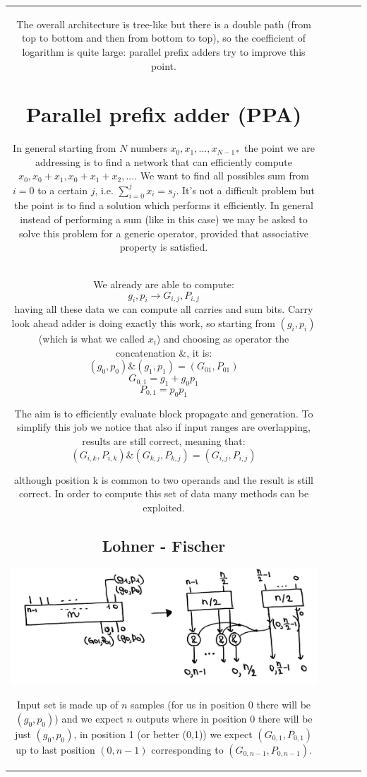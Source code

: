 \begin{center}
\begin{tabular}{|c|c|c|c|c|}
The overall architecture is tree-like but there is a double path (from top to bottom and then from bottom to top), so the coefficient of logarithm is quite large: parallel prefix adders try to improve this point.

\section{Parallel prefix adder (PPA)}

In general starting from $N$ numbers $x_0, x_1, ...,x_{N-1*}$ the point we are addressing is to find a network that can efficiently compute $x_0, x_0+x_1, x_0+x_1+x_2, ...$. We want to find all possibles sum from $i=0$ to a certain $j$, i.e. $\sum_{i=0}^{j} x_i=s_j$. It's not a difficult problem but the point is to find a solution which performs it efficiently. In general instead of performing a sum (like in this case) we may be asked to solve this problem for a generic operator, provided that associative property is satisfied.\\

We already are able to compute:
$$g_i, p_i \longrightarrow G_{i, j}, P_{i, j} $$
having all these data we can compute all carries and sum bits. Carry look ahead adder is doing exactly this work, so starting from $(g_i, p_i)$ (which is what we called $x_i$) and choosing as operator the concatenation \&, it is:
$$(g_0, p_0) \& (g_1, p_1)=(G_{01}, P_{01})$$
$$G_{0,1}=g_1+g_0p_1$$
$$P_{0,1}=p_0p_1$$

The aim is to efficiently evaluate block propagate and generation. To simplify this job we notice that also if input ranges are overlapping, results are still correct, meaning that:
$$(G_{i,k}, P_{i, k}) \& (G_{k, j}, P_{k, j}) = (G_{i,j}, P_{i, j})$$

although position k is common to two operands and the result is still correct. In order to compute this set of data many methods can be exploited.

\subsection{Lohner - Fischer}
\begin{center}
  \includegraphics[width=0.7\linewidth]{img/img2/20}
\end{center}
Input set is made up of $n$ samples (for us in position 0 there will be $(g_0, p_0)$) and we expect $n$ outputs where in position 0 there will be just $(g_0, p_0)$, in position 1 (or better (0,1)) we expect $(G_{0,1}, P_{0,1})$ up to last position $(0, n-1)$ corresponding to $(G_{0,n-1}, P_{0,n-1})$.


\end{tabular}
\end{center}
